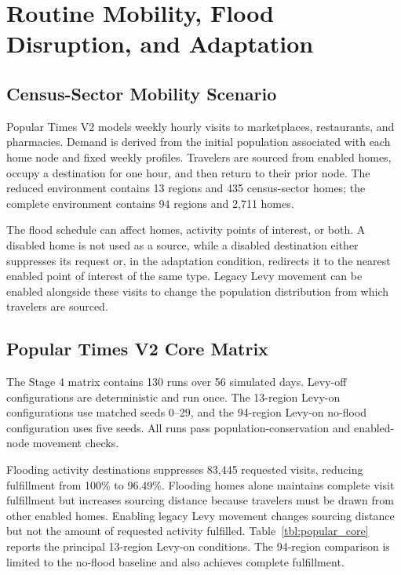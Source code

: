 \documentclass[pdflatex,sn-mathphys-num]{sn-jnl}%
\theoremstyle{thmstyleone}%
\theoremstyle{thmstyletwo}%
\theoremstyle{thmstylethree}%
\begin{document}
\section{Routine Mobility, Flood Disruption, and Adaptation}
\label{sec:flood_mobility}

\subsection{Census-Sector Mobility Scenario}

Popular Times V2 models weekly hourly visits to marketplaces, restaurants, and pharmacies. Demand is derived from the initial population associated with each home node and fixed weekly profiles. Travelers are sourced from enabled homes, occupy a destination for one hour, and then return to their prior node. The reduced environment contains 13 regions and 435 census-sector homes; the complete environment contains 94 regions and 2,711 homes.

The flood schedule can affect homes, activity points of interest, or both. A disabled home is not used as a source, while a disabled destination either suppresses its request or, in the adaptation condition, redirects it to the nearest enabled point of interest of the same type. Legacy Levy movement can be enabled alongside these visits to change the population distribution from which travelers are sourced.

\subsection{Popular Times V2 Core Matrix}

The Stage 4 matrix contains 130 runs over 56 simulated days. Levy-off configurations are deterministic and run once. The 13-region Levy-on configurations use matched seeds 0--29, and the 94-region Levy-on no-flood configuration uses five seeds. All runs pass population-conservation and enabled-node movement checks.

Flooding activity destinations suppresses 83,445 requested visits, reducing fulfillment from 100\% to 96.49\%. Flooding homes alone maintains complete visit fulfillment but increases sourcing distance because travelers must be drawn from other enabled homes. Enabling legacy Levy movement changes sourcing distance but not the amount of requested activity fulfilled. Table~\ref{tbl:popular_core} reports the principal 13-region Levy-on conditions. The 94-region comparison is limited to the no-flood baseline and also achieves complete fulfillment.
\end{document}
